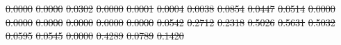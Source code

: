 \documentclass[11pt, a4paper]{book}
\providecommand{\DIFdeltex}[1]{{\protect\color{red}\sout{#1}}}                      %
\providecommand{\DIFdel}[1]{\texorpdfstring{\DIFdeltex{#1}}{}} %
\begin{document}
\DIFdel{0.0000 }%
\DIFdel{0.0000 }%
\DIFdel{0.0302 }%
\DIFdel{0.0000 }%
\DIFdel{0.0001 }%
\DIFdel{0.0004 }%
\DIFdel{0.0038 }%
\DIFdel{0.0854 }%
\DIFdel{0.0447 }%
\DIFdel{0.0514 }%
\DIFdel{0.0000 }%
\DIFdel{0.0000 }%
\DIFdel{0.0000 }%
\DIFdel{0.0000 }%
\DIFdel{0.0000 }%
\DIFdel{0.0000 }%
\DIFdel{0.0542 }%
\DIFdel{0.2712 }%
\DIFdel{0.2318 }%
\DIFdel{0.5026 }%
\DIFdel{0.5631 }%
\DIFdel{0.5032 }%
\DIFdel{0.0595 }%
\DIFdel{0.0545 }%
\DIFdel{0.0000 }%
\DIFdel{0.4289 }%
\DIFdel{0.0789 }%
\DIFdel{0.1420 }%
\end{document}
